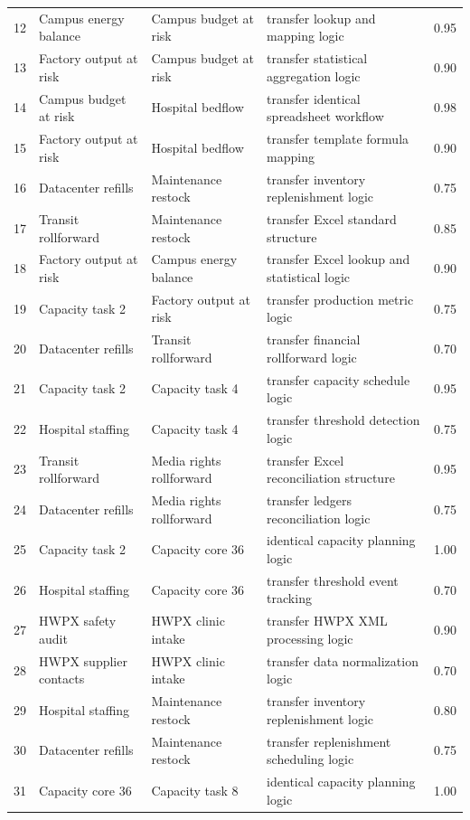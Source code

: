 \documentclass[10pt,landscape]{article}
\begin{document}
\begin{longtable}{@{}r >{\raggedright\arraybackslash}p{3.35cm} >{\raggedright\arraybackslash}p{3.35cm} >{\raggedright\arraybackslash}p{4.75cm} r@{}}
12 & Campus energy balance & Campus budget at risk & transfer lookup and mapping logic & 0.95 \\
13 & Factory output at risk & Campus budget at risk & transfer statistical aggregation logic & 0.90 \\
14 & Campus budget at risk & Hospital bedflow & transfer identical spreadsheet workflow & 0.98 \\
15 & Factory output at risk & Hospital bedflow & transfer template formula mapping & 0.90 \\
16 & Datacenter refills & Maintenance restock & transfer inventory replenishment logic & 0.75 \\
17 & Transit rollforward & Maintenance restock & transfer Excel standard structure & 0.85 \\
18 & Factory output at risk & Campus energy balance & transfer Excel lookup and statistical logic & 0.90 \\
19 & Capacity task 2 & Factory output at risk & transfer production metric logic & 0.75 \\
20 & Datacenter refills & Transit rollforward & transfer financial rollforward logic & 0.70 \\
21 & Capacity task 2 & Capacity task 4 & transfer capacity schedule logic & 0.95 \\
22 & Hospital staffing & Capacity task 4 & transfer threshold detection logic & 0.75 \\
23 & Transit rollforward & Media rights rollforward & transfer Excel reconciliation structure & 0.95 \\
24 & Datacenter refills & Media rights rollforward & transfer ledgers reconciliation logic & 0.75 \\
25 & Capacity task 2 & Capacity core 36 & identical capacity planning logic & 1.00 \\
26 & Hospital staffing & Capacity core 36 & transfer threshold event tracking & 0.70 \\
27 & HWPX safety audit & HWPX clinic intake & transfer HWPX XML processing logic & 0.90 \\
28 & HWPX supplier contacts & HWPX clinic intake & transfer data normalization logic & 0.70 \\
29 & Hospital staffing & Maintenance restock & transfer inventory replenishment logic & 0.80 \\
30 & Datacenter refills & Maintenance restock & transfer replenishment scheduling logic & 0.75 \\
31 & Capacity core 36 & Capacity task 8 & identical capacity planning logic & 1.00 \\

\end{longtable}
\end{document}
